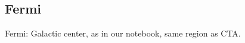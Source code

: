 \subsection{Fermi}
\label{ssec:fermi}

Fermi: Galactic center, as in our notebook, same region as CTA.
